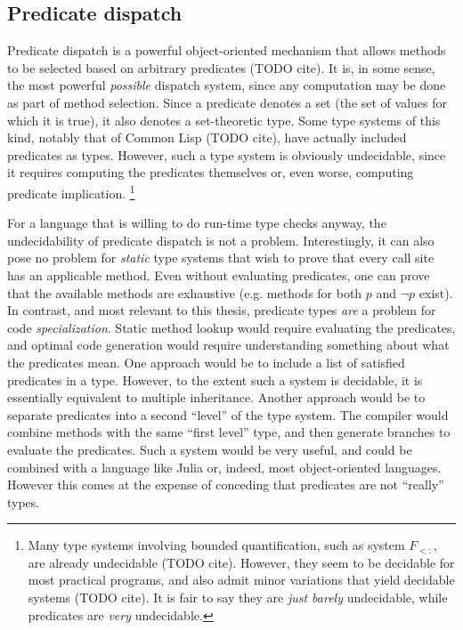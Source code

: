 \subsection{Predicate dispatch}


Predicate dispatch is a powerful object-oriented mechanism that allows
methods to be selected based on arbitrary predicates (TODO cite).
It is, in some
sense, the most powerful \emph{possible} dispatch system, since any
computation may be done as part of method selection. Since a predicate
denotes a set (the set of values for which it is true), it also denotes
a set-theoretic type. Some type systems of this kind, notably that of
Common Lisp (TODO cite), have actually included predicates as types.
However, such a type system is obviously undecidable, since it
requires computing the predicates themselves or, even worse, computing
predicate implication.
\footnote{
Many type systems involving bounded quantification, such as system
$F_{<:}$, are already undecidable (TODO cite).
However, they seem to be decidable for most practical
programs, and also admit minor variations that yield decidable
systems (TODO cite). It is fair to say they are \emph{just barely}
undecidable, while predicates are \emph{very} undecidable.
}

For a language that is willing to do run-time type checks anyway, the
undecidability of predicate dispatch is not a problem.
Interestingly, it can also pose no problem for \emph{static} type systems
that wish to prove that every call site has an applicable method.
Even without evaluating predicates, one can prove that the available methods
are exhaustive (e.g. methods for both $p$ and $\neg p$ exist).
In contrast, and most relevant to this thesis, predicate types \emph{are} a
problem for code \emph{specialization}. Static method lookup would require
evaluating the predicates, and optimal code generation would require
understanding something about what the predicates mean. One approach would
be to include a list of satisfied predicates in a type. However, to the
extent such a system is decidable, it is essentially equivalent to multiple
inheritance. Another approach would be to separate predicates into a
second ``level'' of the type system. The compiler would combine methods
with the same ``first level'' type, and then generate branches to evaluate
the predicates. Such a system would be very useful, and could be
combined with a language like Julia or, indeed, most object-oriented
languages. However this comes at the expense of conceding that predicates
are not ``really'' types.

